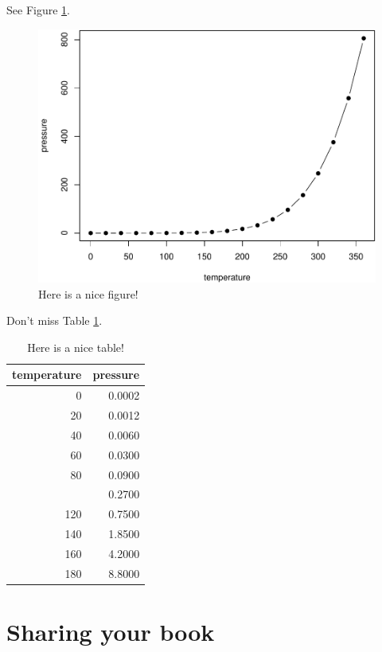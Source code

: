 \documentclass[
]{book}
\theoremstyle{definition}
\theoremstyle{definition}
\theoremstyle{definition}
\theoremstyle{definition}
\theoremstyle{remark}
\begin{document}
See Figure \ref{fig:nice-fig}.

\begin{figure}

{\centering \includegraphics[width=0.8\linewidth]{_main_files/figure-latex/nice-fig-1} 

}

\caption{Here is a nice figure!}\label{fig:nice-fig}
\end{figure}

Don't miss Table \ref{tab:nice-tab}.

\begin{table}

\caption{\label{tab:nice-tab}Here is a nice table!}
\centering
\begin{tabular}[t]{rr}
\toprule
temperature & pressure\\
\midrule
0 & 0.0002\\
20 & 0.0012\\
40 & 0.0060\\
60 & 0.0300\\
80 & 0.0900\\
\addlinespace
100 & 0.2700\\
120 & 0.7500\\
140 & 1.8500\\
160 & 4.2000\\
180 & 8.8000\\
\bottomrule
\end{tabular}
\end{table}

\hypertarget{sharing-your-book}{%
\section{Sharing your book}\label{sharing-your-book}}
\end{document}
